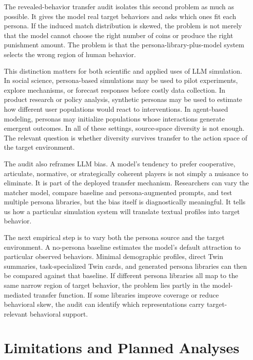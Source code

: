 \documentclass[11pt]{article}
\begin{document}
The revealed-behavior transfer audit isolates this second problem as much as possible. It gives the model real target behaviors and asks which ones fit each persona. If the induced match distribution is skewed, the problem is not merely that the model cannot choose the right number of coins or produce the right punishment amount. The problem is that the persona-library-plus-model system selects the wrong region of human behavior.

This distinction matters for both scientific and applied uses of LLM simulation. In social science, persona-based simulations may be used to pilot experiments, explore mechanisms, or forecast responses before costly data collection. In product research or policy analysis, synthetic personas may be used to estimate how different user populations would react to interventions. In agent-based modeling, personas may initialize populations whose interactions generate emergent outcomes. In all of these settings, source-space diversity is not enough. The relevant question is whether diversity survives transfer to the action space of the target environment.

The audit also reframes LLM bias. A model's tendency to prefer cooperative, articulate, normative, or strategically coherent players is not simply a nuisance to eliminate. It is part of the deployed transfer mechanism. Researchers can vary the matcher model, compare baseline and persona-augmented prompts, and test multiple persona libraries, but the bias itself is diagnostically meaningful. It tells us how a particular simulation system will translate textual profiles into target behavior.

The next empirical step is to vary both the persona source and the target environment. A no-persona baseline estimates the model's default attraction to particular observed behaviors. Minimal demographic profiles, direct Twin summaries, task-specialized Twin cards, and generated persona libraries can then be compared against that baseline. If different persona libraries all map to the same narrow region of target behavior, the problem lies partly in the model-mediated transfer function. If some libraries improve coverage or reduce behavioral skew, the audit can identify which representations carry target-relevant behavioral support.

\section{Limitations and Planned Analyses}
\end{document}

